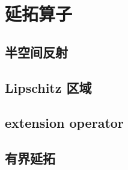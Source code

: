 \section{延拓算子}
\label{b1:sec:2203}


\subsection{半空间反射}
\label{b1:subsec:220301}

\subsection{Lipschitz 区域}
\label{b1:subsec:220302}

\subsection{extension operator}
\label{b1:subsec:220303}

\subsection{有界延拓}
\label{b1:subsec:220304}


